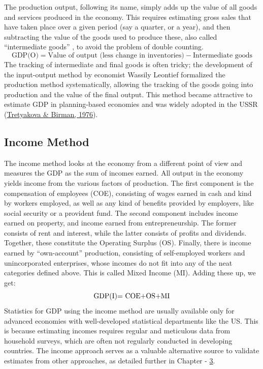 \documentclass[12pt,nobind, a4paper]{reedthesis}
\begin{document}
 The production output, following its name, simply adds up the value of all goods and services produced in the economy. This requires estimating gross sales that have taken place over a given period (say a quarter, or a year), and then subtracting the value of the goods used to produce these, also called ``intermediate goods'' , to avoid the problem of double counting.
 \begin{equation}
 \text{GDP(O)}= \text{Value of output (less change in inventories)} - \text{Intermediate goods}
 \end{equation}
 The tracking of intermediate and final goods is often tricky; the development of the input-output method by economist Wassily Leontief formalized the production method systematically, allowing the tracking of the goods going into production and the value of the final output. This method became attractive to estimate GDP in planning-based economies and was widely adopted in the USSR (\protect\hyperlink{ref-tretyakova_input-output_1976}{Tretyakova \& Birman, 1976}).

 \hypertarget{income-method}{%
 \subsection{Income Method}\label{income-method}}

 The income method looks at the economy from a different point of view and measures the GDP as the sum of incomes earned. All output in the economy yields income from the various factors of production. The first component is the compensation of employees (COE), consisting of wages earned in cash and kind by workers employed, as well as any kind of benefits provided by employers, like social security or a provident fund. The second component includes income earned on property, and income earned from entrepreneurship. The former consists of rent and interest, while the latter consists of profits and dividends. Together, these constitute the Operating Surplus (OS). Finally, there is income earned by ``own-account'' production, consisting of self-employed workers and unincorporated enterprises, whose incomes do not fit into any of the neat categories defined above. This is called Mixed Income (MI). Adding these up, we get:
 \begin{equation}
 \text{GDP(I)= \text{COE}+\text{OS}+\text{MI}}
 \end{equation}
 Statistics for GDP using the income method are usually available only for advanced economies with well-developed statistical departments like the US. This is because estimating incomes requires regular and meticulous data from household surveys, which are often not regularly conducted in developing countries. The income approach serves as a valuable alternative source to validate estimates from other approaches, as detailed further in Chapter - \protect\hyperlink{ch3}{3}.
\end{document}
